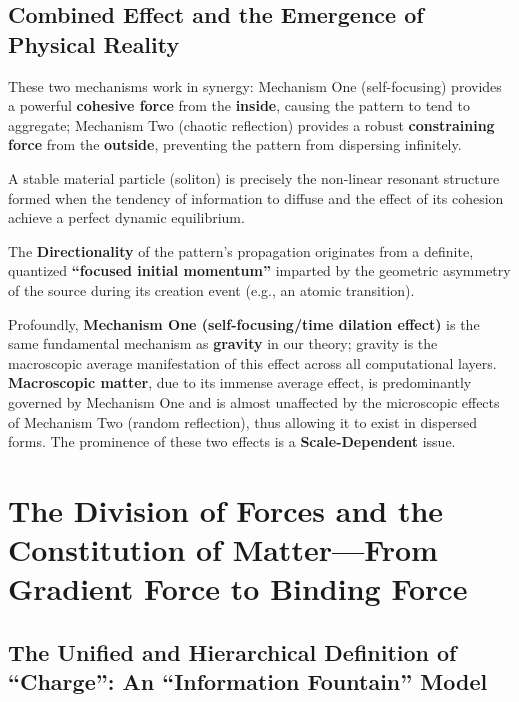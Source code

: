 \documentclass[11pt, a4paper]{article}
\begin{document}
\subsection{Combined Effect and the Emergence of Physical Reality}

These two mechanisms work in synergy: Mechanism One (self-focusing) provides a powerful \textbf{cohesive force} from the \textbf{inside}, causing the pattern to tend to aggregate; Mechanism Two (chaotic reflection) provides a robust \textbf{constraining force} from the \textbf{outside}, preventing the pattern from dispersing infinitely.

A stable material particle (soliton) is precisely the non-linear resonant structure formed when the tendency of information to diffuse and the effect of its cohesion achieve a perfect dynamic equilibrium.

The \textbf{Directionality} of the pattern's propagation originates from a definite, quantized \textbf{``focused initial momentum''} imparted by the geometric asymmetry of the source during its creation event (e.g., an atomic transition).

Profoundly, \textbf{Mechanism One (self-focusing/time dilation effect)} is the same fundamental mechanism as \textbf{gravity} in our theory; gravity is the macroscopic average manifestation of this effect across all computational layers. \textbf{Macroscopic matter}, due to its immense average effect, is predominantly governed by Mechanism One and is almost unaffected by the microscopic effects of Mechanism Two (random reflection), thus allowing it to exist in dispersed forms. The prominence of these two effects is a \textbf{Scale-Dependent} issue.

\section{The Division of Forces and the Constitution of Matter---From Gradient Force to Binding Force}

\subsection{The Unified and Hierarchical Definition of ``Charge'': An ``Information Fountain'' Model}
\end{document}
